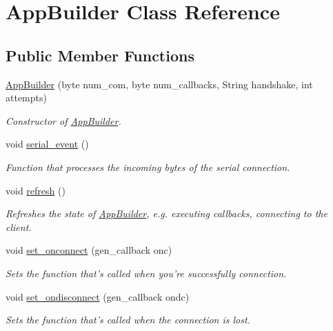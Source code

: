\hypertarget{class_app_builder}{\section{App\+Builder Class Reference}
\label{class_app_builder}
}
\subsection*{Public Member Functions}
\begin{DoxyCompactItemize}
\item 
\hyperlink{class_app_builder_a8e5cd755fa5555a73b84589da4fccb21}{App\+Builder} (byte num\+\_\+com, byte num\+\_\+callbacks, String handshake, int attempts)
\begin{DoxyCompactList}\small\item\em Constructor of \hyperlink{class_app_builder}{App\+Builder}. \end{DoxyCompactList}\item 
void \hyperlink{class_app_builder_a268678c3d51426d77d902f9c98623770}{serial\+\_\+event} ()
\begin{DoxyCompactList}\small\item\em Function that processes the incoming bytes of the serial connection. \end{DoxyCompactList}\item 
void \hyperlink{class_app_builder_ac96ab83cc3c1b78a3512946cbc2e79af}{refresh} ()
\begin{DoxyCompactList}\small\item\em Refreshes the state of \hyperlink{class_app_builder}{App\+Builder}, e.\+g. executing callbacks, connecting to the client. \end{DoxyCompactList}\item 
void \hyperlink{class_app_builder_a0e197a5352ce38ce0fc5af978af627fe}{set\+\_\+onconnect} (gen\+\_\+callback onc)
\begin{DoxyCompactList}\small\item\em Sets the function that's called when you're successfully connection. \end{DoxyCompactList}\item 
void \hyperlink{class_app_builder_a44dad5e92a961e4911edcac5b9557a55}{set\+\_\+ondisconnect} (gen\+\_\+callback ondc)
\begin{DoxyCompactList}\small\item\em Sets the function that's called when the connection is lost. \end{DoxyCompactList}\item 

\end{DoxyCompactItemize}
